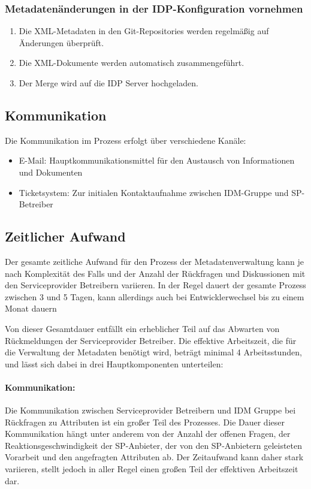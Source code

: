 \documentclass[a4paper, fontsize=11pt]{scrartcl}
\begin{document}
\subsubsection{Metadatenänderungen in der IDP-Konfiguration vornehmen}

\begin{enumerate}
  \item Die XML-Metadaten in den Git-Repositories werden regelmäßig auf Änderungen überprüft.
  \item Die XML-Dokumente werden automatisch zusammengeführt.
  \item Der Merge wird auf die IDP Server hochgeladen.
\end{enumerate}

\subsection{Kommunikation}
Die Kommunikation im Prozess erfolgt über verschiedene Kanäle:

\begin{itemize}
  \item E-Mail: Hauptkommunikationsmittel für den Austausch von Informationen und Dokumenten
  \item Ticketsystem: Zur initialen Kontaktaufnahme zwischen IDM-Gruppe und SP-Betreiber
\end{itemize}

\subsection{Zeitlicher Aufwand}

Der gesamte zeitliche Aufwand für den Prozess der Metadatenverwaltung kann je nach Komplexität des Falls und der Anzahl der Rückfragen und Diskussionen mit den Serviceprovider Betreibern variieren. 
In der Regel dauert der gesamte Prozess zwischen 3 und 5 Tagen, kann allerdings auch bei Entwicklerwechsel bis zu einem Monat dauern

Von dieser Gesamtdauer entfällt ein erheblicher Teil auf das Abwarten von Rückmeldungen der Serviceprovider Betreiber.
Die effektive Arbeitszeit, die für die Verwaltung der Metadaten benötigt wird, beträgt minimal 4 Arbeitsstunden, und lässt sich dabei in drei Hauptkomponenten unterteilen:

\paragraph{Kommunikation:}
Die Kommunikation zwischen Serviceprovider Betreibern und IDM Gruppe bei Rückfragen zu Attributen ist ein großer Teil des Prozesses.
Die Dauer dieser Kommunikation hängt unter anderem von der Anzahl der offenen Fragen, der Reaktionsgeschwindigkeit der SP-Anbieter, der von den SP-Anbietern geleisteten Vorarbeit und den angefragten Attributen ab. 
Der Zeitaufwand kann daher stark variieren, stellt jedoch in aller Regel einen großen Teil der effektiven Arbeitszeit dar.
\end{document}
